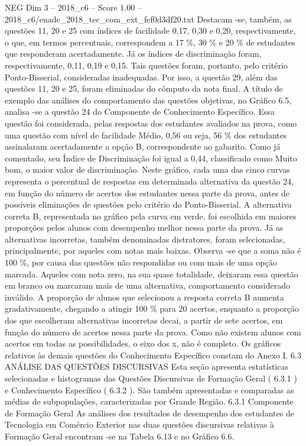 \begin{textsample}{NEG Dim 3 – 2018\_c6 – Score 1.00 – 2018\_c6/enade\_2018\_tec\_com\_ext\_fef0d3df20.txt}
Destacam -se, também, as questões 11, 20 e 25 com índices de facilidade 0,17, 0,30 e 0,20, respectivamente, o que, em termos percentuais, correspondem a 17 \%, 30 \% e 20 \% de estudantes que responderam acertadamente.
Já os índices de discriminação foram, respectivamente, 0,11, 0,19 e 0,15.
Tais questões foram, portanto, pelo critério Ponto-Bisserial, consideradas inadequadas.
Por isso, a questão 29, além das questões 11, 20 e 25, foram eliminadas do cômputo da nota final.
A título de exemplo das análises do comportamento das questões objetivas, no Gráfico 6.5, analisa -se a questão 24 do Componente de Conhecimento Específico.
Essa questão foi considerada, pelas respostas dos estudantes avaliados na prova, como uma questão com nível de facilidade Médio, 0,56 ou seja, 56 \% dos estudantes assinalaram acertadamente a opção B, correspondente ao gabarito.
Como já comentado, seu Índice de Discriminação foi igual a 0,44, classificado como Muito bom, o maior valor de discriminação.
Neste gráfico, cada uma das cinco curvas representa o percentual de respostas em determinada alternativa da questão 24, em função do número de acertos dos estudantes nessa parte da prova, antes de possíveis eliminações de questões pelo critério do Ponto-Bisserial.
A alternativa correta B, representada no gráfico pela curva em verde, foi escolhida em maiores proporções pelos alunos com desempenho melhor nessa parte da prova.
Já as alternativas incorretas, também denominadas distratores, foram selecionadas, principalmente, por aqueles com notas mais baixas.
Observa -se que a soma não é 100 \%, por causa das questões não respondidas ou com mais de uma opção marcada.
Aqueles com nota zero, na sua quase totalidade, deixaram essa questão em branco ou marcaram mais de uma alternativa, comportamento considerado inválido.
A proporção de alunos que selecionou a resposta correta B aumenta gradativamente, chegando a atingir 100 \% para 20 acertos, enquanto a proporção dos que escolheram alternativas incorretas decai, a partir de sete acertos, em função do número de acertos nessa parte da prova.
Como não existem alunos com acertos em todas as possibilidades, o eixo dos x, não é completo.
Os gráficos relativos às demais questões do Conhecimento Específico constam do Anexo I. 6.3 ANÁLISE DAS QUESTÕES DISCURSIVAS Esta seção apresenta estatísticas selecionadas e histogramas das Questões Discursivas de Formação Geral ( 6.3.1 ) e Conhecimento Específico ( 6.3.2 ).
São também apresentadas e comparadas as médias de subpopulações, caracterizadas por Grande Região. 6.3.1 Componente de Formação Geral As análises dos resultados de desempenho dos estudantes de Tecnologia em Comércio Exterior nas duas questões discursivas relativas à Formação Geral encontram -se na Tabela 6.13 e no Gráfico 6.6.

\end{textsample}
